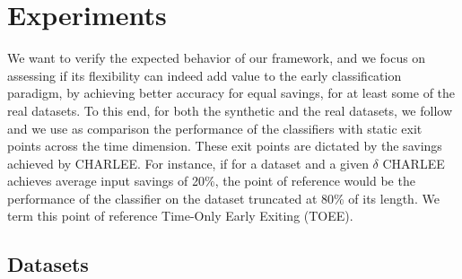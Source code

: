 \documentclass[conference]{IEEEtran}
\begin{document}
\section{Experiments}
We want to verify the expected behavior of our framework, and we focus on assessing if its flexibility can indeed add value to the early classification paradigm, by achieving better accuracy for equal savings, for at least some of the real datasets. To this end, for both the synthetic and the real datasets, we follow \cite{martinez2020adaptive} and we use as comparison the performance of the classifiers with static exit points across the time dimension. These exit points are dictated by the savings achieved by CHARLEE. For instance, if for a dataset and a given $\delta$ CHARLEE achieves average input savings of 20\%, the point of reference would be the performance of the classifier on the dataset truncated at 80\% of its length. We term this point of reference Time-Only Early Exiting (TOEE). 

\subsection{Datasets}
\end{document}
